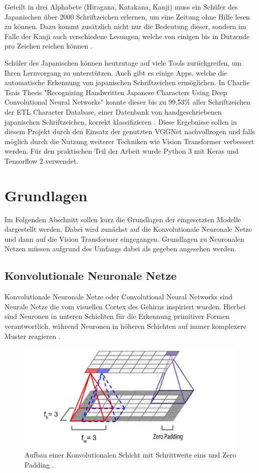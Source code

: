 \documentclass[twoside,a4paper]{IEEEtran}
\begin{document}
Geteilt in drei Alphabete (Hiragana, Katakana, Kanji) muss ein Schüler des Japanischen über 2000 Schriftzeichen erlernen, um eine Zeitung ohne Hilfe lesen zu können. Dazu kommt zusätzlich nicht nur die Bedeutung dieser, sondern im Falle der Kanji auch verschiedene Lesungen, welche von einigen bis in Dutzende pro Zeichen reichen können \cite{ABOUT_JAPANESE}.

Schüler des Japanischen können heutzutage auf viele Tools zurückgreifen, um Ihren Lernvorgang zu unterstützen. Auch gibt es einige Apps, welche die automatische Erkennung von japanischen Schriftzeichen ermöglichen. In Charlie Tsais Thesis "Recognizing Handwritten Japanese Characters Using Deep Convolutional Neural Networks" konnte dieser bis zu 99,53\% aller Schriftzeichen der ETL Character Database, einer Datenbank von handgeschriebenen japanischen Schriftzeichen, korrekt klassifizieren \cite{RHC}. Diese Ergebnisse sollen in diesem Projekt durch den Einsatz der genutzten VGGNet nachvollzogen und falls möglich durch die Nutzung weiterer Techniken wie Vision Transformer verbessert werden. Für den praktischen Teil der Arbeit wurde Python 3 mit Keras und Tensorflow 2 verwendet.
\section{Grundlagen}
Im Folgenden Abschnitt sollen kurz die Grundlagen der eingesetzten Modelle dargestellt werden. Dabei wird zunächst auf die Konvolutionale Neuronale Netze und dann auf die Vision Transformer eingegangen. Grundlagen zu Neuronalen Netzen müssen aufgrund des Umfangs dabei als gegeben angesehen werden.
\subsection{Konvolutionale Neuronale Netze} %
Konvolutionale Neuronale Netze oder Convolutional Neural Networks sind Neurale Netze die vom visuellen Cortex des Gehirns inspiriert wurden. Hierbei sind Neuronen in unteren Schichten für die Erkennung primitiver Formen verantwortlich, während Neuronen in höheren Schichten auf immer komplexere Muster reagieren \cite[S.360]{MACHINE_LEARNING}. 
\begin{figure}[!htb]
	\includegraphics[width=\columnwidth]{cnn}
	\caption{Aufbau einer Konvolutionalen Schicht mit Schrittweite eins und Zero Padding \cite[S.362]{MACHINE_LEARNING}.}
	\label{bild1}
\end{figure}
\end{document}
